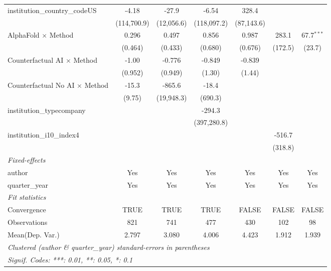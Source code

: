 \begin{tabular}{lcccccc}
   institution\_country\_codeUS          & -4.18        & -27.9        & -6.54        & 328.4        &                &   \\   
                                         & (114,700.9)  & (12,056.6)   & (118,097.2)  & (87,143.6)   &                &   \\   
   AlphaFold $\times$ Method             & 0.296        & 0.497        & 0.856        & 0.987        & 283.1          & 67.7$^{***}$\\   
                                         & (0.464)      & (0.433)      & (0.680)      & (0.676)      & (172.5)        & (23.7)\\   
   Counterfactual AI $\times$ Method     & -1.00        & -0.776       & -0.849       & -0.839       &                &   \\   
                                         & (0.952)      & (0.949)      & (1.30)       & (1.44)       &                &   \\   
   Counterfactual No AI $\times$ Method  & -15.3        & -865.6       & -18.4        &              &                &   \\   
                                         & (9.75)       & (19,948.3)   & (690.3)      &              &                &   \\   
   institution\_typecompany              &              &              & -294.3       &              &                &   \\   
                                         &              &              & (397,280.8)  &              &                &   \\   
   institution\_i10\_index4              &              &              &              &              & -516.7         &   \\   
                                         &              &              &              &              & (318.8)        &   \\   
   \midrule
   \emph{Fixed-effects}\\
   author                                & Yes          & Yes          & Yes          & Yes          & Yes            & Yes\\  
   quarter\_year                         & Yes          & Yes          & Yes          & Yes          & Yes            & Yes\\  
   \midrule
   \emph{Fit statistics}\\
   Convergence                           &TRUE          & TRUE         & TRUE         & FALSE        & FALSE          & FALSE\\  
   Observations                          & 821          & 741          & 477          & 430          & 102            & 98\\  
Mean(Dep. Var.) & 2.797 & 3.080 & 4.006 & 4.423 & 1.912 & 1.939 \\
   \midrule \midrule
   \multicolumn{7}{l}{\emph{Clustered (author \& quarter\_year) standard-errors in parentheses}}\\
   \multicolumn{7}{l}{\emph{Signif. Codes: ***: 0.01, **: 0.05, *: 0.1}}\\
\end{tabular}
\par\endgroup
